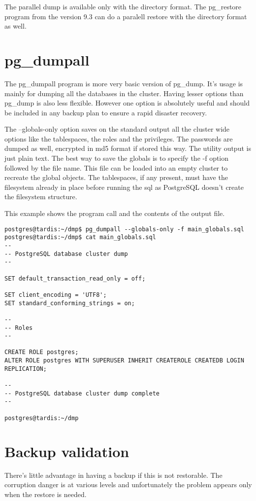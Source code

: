 The parallel dump is available only with the directory format. The pg\_restore program 
from the version 9.3 can do a paralell restore with the directory format as well.

\section{pg\_dumpall}
The pg\_dumpall program is more very basic version of pg\_dump. It's usage is mainly for 
dumping all the databases in the cluster. Having lesser options than pg\_dump is also less 
flexible. However one option is absolutely useful and should be included in any backup plan to 
ensure a rapid disaster recovery.\newline

The --globals-only option saves on the standard output all the 
cluster wide options like the tablespaces, the roles and the privileges. The passwords are dumped as 
well, encrypted in md5 format if stored this way. The utility output is just plain text. 
The best way to save the globals is to specify the -f option followed by the file name. This file 
can be loaded into an empty cluster to recreate the global objects. The tablespaces, if any present, 
must have the filesystem already in place before running the sql as PostgreSQL doesn't create the 
filesystem structure.\newline

This example shows the program call and the contents of the output file.
\begin{lstlisting}[style=pgsql]
postgres@tardis:~/dmp$ pg_dumpall --globals-only -f main_globals.sql
postgres@tardis:~/dmp$ cat main_globals.sql 
--
-- PostgreSQL database cluster dump
--

SET default_transaction_read_only = off;

SET client_encoding = 'UTF8';
SET standard_conforming_strings = on;

--
-- Roles
--

CREATE ROLE postgres;
ALTER ROLE postgres WITH SUPERUSER INHERIT CREATEROLE CREATEDB LOGIN REPLICATION;

--
-- PostgreSQL database cluster dump complete
--

postgres@tardis:~/dmp

\end{lstlisting}


\section{Backup validation}
There's little advantage in having a backup if this is not restorable. The corruption danger is at 
various levels and unfortunately the problem appears only when the restore is needed.\newline 

